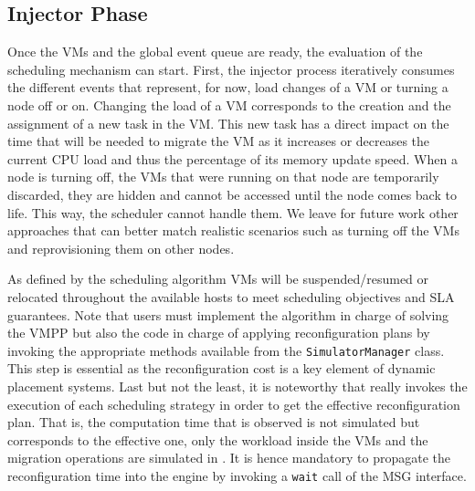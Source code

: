 \subsection{Injector Phase}

Once the VMs and the global event queue are ready, the evaluation of
the scheduling mechanism can start. First, the injector process
iteratively consumes the different events that represent, for now,
load changes of a VM or turning a node off or on. Changing the load of
a VM corresponds to the creation and the assignment of a new \sg task
in the VM. This new task has a direct impact on the time that will be
needed to migrate the VM as it increases or decreases the current CPU
load and thus the percentage of its memory update speed.
When a node is turning off, the VMs that were running on that node are
temporarily discarded, \ie they are hidden and cannot be accessed
until the node comes back to life. This way, the scheduler cannot
handle them.
 We leave for future work other approaches that can better
match realistic scenarios such as turning off the VMs and
reprovisioning them on other nodes.
%

As defined by the scheduling algorithm VMs will be suspended/resumed
or relocated throughout the available hosts to meet scheduling
objectives and SLA guarantees.  Note that users must implement the
algorithm in charge of solving the VMPP but also the code in charge of
applying reconfiguration plans by invoking the appropriate methods
available from the \texttt{SimulatorManager} class. This step is
essential as the reconfiguration cost is a key element of dynamic
placement systems.    Last but not the least, it is noteworthy
that \vmps really invokes the execution of each scheduling strategy in
order to get the effective reconfiguration plan.  That is, the
computation time that is observed is not simulated but corresponds to
the effective one, only the workload inside the VMs and the migration
operations are simulated in \sg. It is hence mandatory to propagate
the reconfiguration time into the \sg engine by invoking a
\texttt{wait} call of the MSG interface.

